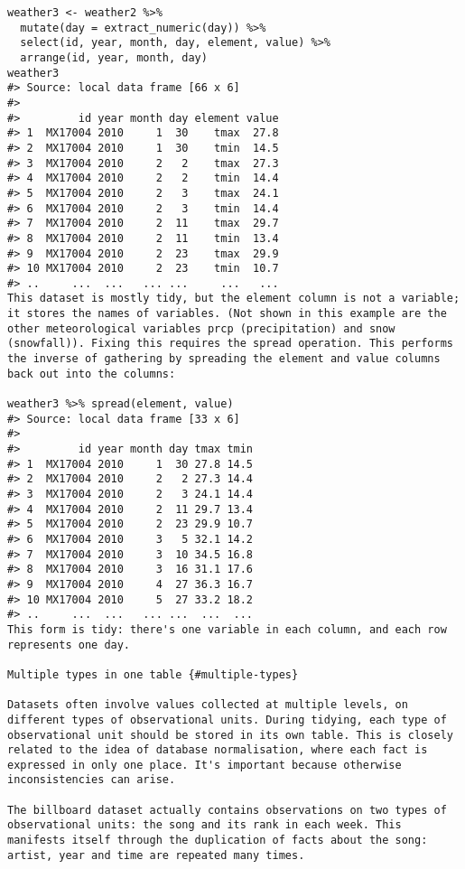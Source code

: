 \begin{framed}
\begin{verbatim}
weather3 <- weather2 %>% 
  mutate(day = extract_numeric(day)) %>%
  select(id, year, month, day, element, value) %>%
  arrange(id, year, month, day)
weather3
#> Source: local data frame [66 x 6]
#> 
#>         id year month day element value
#> 1  MX17004 2010     1  30    tmax  27.8
#> 2  MX17004 2010     1  30    tmin  14.5
#> 3  MX17004 2010     2   2    tmax  27.3
#> 4  MX17004 2010     2   2    tmin  14.4
#> 5  MX17004 2010     2   3    tmax  24.1
#> 6  MX17004 2010     2   3    tmin  14.4
#> 7  MX17004 2010     2  11    tmax  29.7
#> 8  MX17004 2010     2  11    tmin  13.4
#> 9  MX17004 2010     2  23    tmax  29.9
#> 10 MX17004 2010     2  23    tmin  10.7
#> ..     ...  ...   ... ...     ...   ...
This dataset is mostly tidy, but the element column is not a variable; it stores the names of variables. (Not shown in this example are the other meteorological variables prcp (precipitation) and snow (snowfall)). Fixing this requires the spread operation. This performs the inverse of gathering by spreading the element and value columns back out into the columns:

weather3 %>% spread(element, value)
#> Source: local data frame [33 x 6]
#> 
#>         id year month day tmax tmin
#> 1  MX17004 2010     1  30 27.8 14.5
#> 2  MX17004 2010     2   2 27.3 14.4
#> 3  MX17004 2010     2   3 24.1 14.4
#> 4  MX17004 2010     2  11 29.7 13.4
#> 5  MX17004 2010     2  23 29.9 10.7
#> 6  MX17004 2010     3   5 32.1 14.2
#> 7  MX17004 2010     3  10 34.5 16.8
#> 8  MX17004 2010     3  16 31.1 17.6
#> 9  MX17004 2010     4  27 36.3 16.7
#> 10 MX17004 2010     5  27 33.2 18.2
#> ..     ...  ...   ... ...  ...  ...
This form is tidy: there's one variable in each column, and each row represents one day.

Multiple types in one table {#multiple-types}

Datasets often involve values collected at multiple levels, on different types of observational units. During tidying, each type of observational unit should be stored in its own table. This is closely related to the idea of database normalisation, where each fact is expressed in only one place. It's important because otherwise inconsistencies can arise.

The billboard dataset actually contains observations on two types of observational units: the song and its rank in each week. This manifests itself through the duplication of facts about the song: artist, year and time are repeated many times.


\end{verbatim}
\end{framed}
